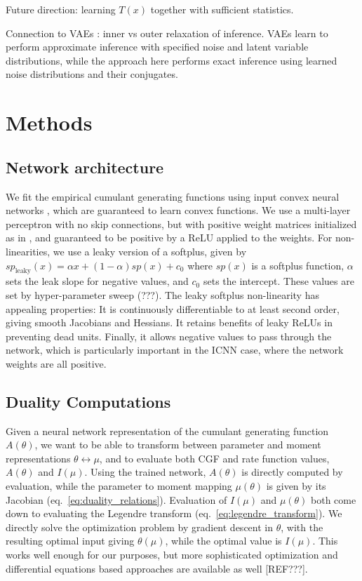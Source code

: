 \documentclass[10pt]{article}      %
\begin{document}
Future direction: learning $T(x)$ together with sufficient statistics.

Connection to VAEs \cite{kingma_auto-encoding_2013}: inner vs outer relaxation of inference.
VAEs learn to perform approximate inference with specified noise and latent variable distributions, while the approach here performs exact inference using learned noise distributions and their conjugates. 


\section{Methods}
\subsection{Network architecture}

We fit the empirical cumulant generating functions using input convex neural networks \cite{amos_input_2017}, which are guaranteed to learn convex functions.
We use a multi-layer perceptron with no skip connections, but with positive weight matrices initialized as in \cite{hoedt_principled_2023}, and guaranteed to be positive by a ReLU applied to the weights.
For non-linearities, we use a leaky version of a softplus, given by $sp_{\textrm{leaky}}(x) = \alpha x + (1 - \alpha) sp(x) + c_0$ where $sp(x)$ is a softplus function, $\alpha$ sets the leak slope for negative values, and $c_0$ sets the intercept. 
These values are set by hyper-parameter sweep (???). 
The leaky softplus non-linearity has appealing properties:
It is continuously differentiable to at least second order, giving smooth Jacobians and Hessians.
It retains benefits of leaky ReLUs in preventing dead units.
Finally, it allows negative values to pass through the network, which is particularly important in the ICNN case, where the network weights are all positive.




\subsection{Duality Computations}
Given a neural network representation of the cumulant generating function $A(\theta)$, we want to be able to transform between parameter and moment representations $\theta \leftrightarrow \mu$, and to evaluate both CGF and rate function values, $A(\theta)$ and $I(\mu)$.
Using the trained network, $A(\theta)$ is directly computed by evaluation, while the parameter to moment mapping $\mu(\theta)$ is given by its Jacobian (eq.~\ref{eq:duality_relations}).
Evaluation of $I(\mu)$ and $\mu(\theta)$ both come down to evaluating the Legendre transform (eq.~\ref{eq:legendre_transform}). 
We directly solve the optimization problem by gradient descent in $\theta$, with the resulting optimal input giving $\theta(\mu)$, while the optimal value is $I(\mu)$.
This works well enough for our purposes, but more sophisticated optimization and differential equations based approaches are available as well [REF???].





\end{document}
